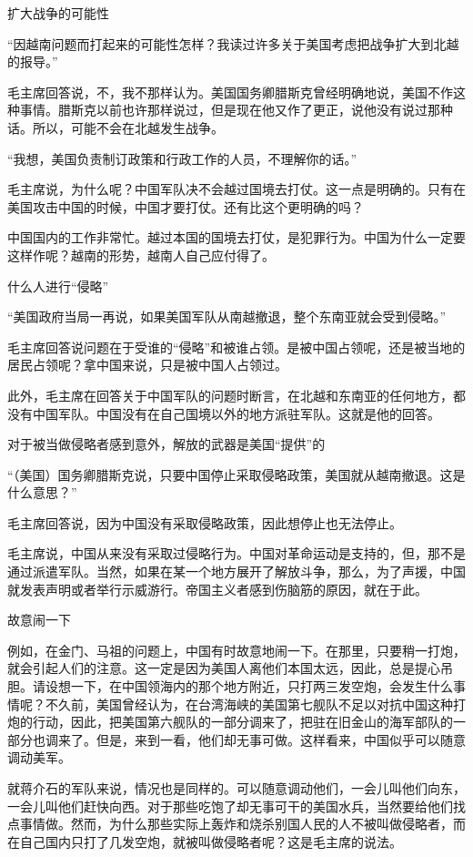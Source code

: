扩大战争的可能性

“因越南问题而打起来的可能性怎样？我读过许多关于美国考虑把战争扩大到北越的报导。”

毛主席回答说，不，我不那样认为。美国国务卿腊斯克曾经明确地说，美国不作这种事情。腊斯克以前也许那样说过，但是现在他又作了更正，说他没有说过那种话。所以，可能不会在北越发生战争。

“我想，美国负责制订政策和行政工作的人员，不理解你的话。”

毛主席说，为什么呢？中国军队决不会越过国境去打仗。这一点是明确的。只有在美国攻击中国的时候，中国才要打仗。还有比这个更明确的吗？

中国国内的工作非常忙。越过本国的国境去打仗，是犯罪行为。中国为什么一定要这样作呢？越南的形势，越南人自己应付得了。

什么人进行“侵略”

“美国政府当局一再说，如果美国军队从南越撤退，整个东南亚就会受到侵略。”

毛主席回答说问题在于受谁的“侵略”和被谁占领。是被中国占领呢，还是被当地的居民占领呢？拿中国来说，只是被中国人占领过。

此外，毛主席在回答关于中国军队的问题时断言，在北越和东南亚的任何地方，都没有中国军队。中国没有在自己国境以外的地方派驻军队。这就是他的回答。

对于被当做侵略者感到意外，解放的武器是美国“提供”的

“（美国）国务卿腊斯克说，只要中国停止采取侵略政策，美国就从越南撤退。这是什么意思？”

毛主席回答说，因为中国没有采取侵略政策，因此想停止也无法停止。

毛主席说，中国从来没有采取过侵略行为。中国对革命运动是支持的，但，那不是通过派遣军队。当然，如果在某一个地方展开了解放斗争，那么，为了声援，中国就发表声明或者举行示威游行。帝国主义者感到伤脑筋的原因，就在于此。

故意闹一下

例如，在金门、马祖的问题上，中国有时故意地闹一下。在那里，只要稍一打炮，就会引起人们的注意。这一定是因为美国人离他们本国太远，因此，总是提心吊胆。请设想一下，在中国领海内的那个地方附近，只打两三发空炮，会发生什么事情呢？不久前，美国曾经认为，在台湾海峡的美国第七舰队不足以对抗中国这种打炮的行动，因此，把美国第六舰队的一部分调来了，把驻在旧金山的海军部队的一部分也调来了。但是，来到一看，他们却无事可做。这样看来，中国似乎可以随意调动美军。

就蒋介石的军队来说，情况也是同样的。可以随意调动他们，一会儿叫他们向东，一会儿叫他们赶快向西。对于那些吃饱了却无事可干的美国水兵，当然要给他们找点事情做。然而，为什么那些实际上轰炸和烧杀别国人民的人不被叫做侵略者，而在自己国内只打了几发空炮，就被叫做侵略者呢？这是毛主席的说法。


